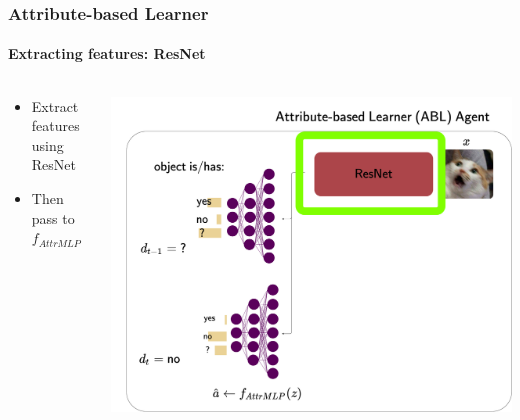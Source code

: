 \documentclass[9pt]{beamer}
\begin{document}
\begin{frame}
\frametitle{Attribute-based Learner}
\framesubtitle{Extracting features: ResNet}
\begin{columns}[T]
	\begin{column}{.5\textwidth}
		\begin{itemize}
			\item Extract features using ResNet
			\item Then pass to $f_{AttrMLP}$
		\end{itemize}
	\end{column}
	\begin{column}{.5\textwidth}
		\includegraphics[width=\textwidth]{images/urdtc_parts_resnet.pdf}
	\end{column}
\end{columns}
\end{frame}
\end{document}
